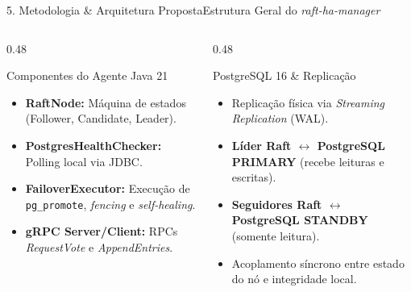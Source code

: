 \documentclass[aspectratio=169,10pt]{beamer}
\begin{document}
\begin{frame}{5. Metodologia \& Arquitetura Proposta}{Estrutura Geral do \textit{raft-ha-manager}}
  \begin{columns}[t]
    \begin{column}{0.48\textwidth}
      \begin{block}{Componentes do Agente Java 21}
        \begin{itemize}
          \item \textbf{RaftNode:} Máquina de estados (Follower, Candidate, Leader).
          \item \textbf{PostgresHealthChecker:} Polling local via JDBC.
          \item \textbf{FailoverExecutor:} Execução de \texttt{pg\_promote}, \textit{fencing} e \textit{self-healing}.
          \item \textbf{gRPC Server/Client:} RPCs \textit{RequestVote} e \textit{AppendEntries}.
        \end{itemize}
      \end{block}
    \end{column}
    \begin{column}{0.48\textwidth}
      \begin{block}{PostgreSQL 16 \& Replicação}
        \begin{itemize}
          \item Replicação física via \textit{Streaming Replication} (WAL).
          \item \textbf{Líder Raft $\leftrightarrow$ PostgreSQL PRIMARY} (recebe leituras e escritas).
          \item \textbf{Seguidores Raft $\leftrightarrow$ PostgreSQL STANDBY} (somente leitura).
          \item Acoplamento síncrono entre estado do nó e integridade local.
        \end{itemize}
      \end{block}
    \end{column}
  \end{columns}
\end{frame}
\end{document}
